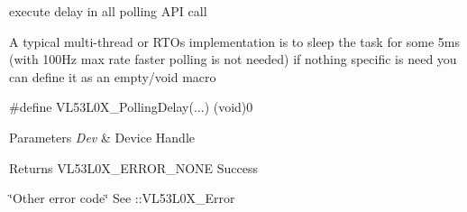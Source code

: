 execute delay in all polling A\+PI call 

A typical multi-\/thread or R\+T\+Os implementation is to sleep the task for some 5ms (with 100\+Hz max rate faster polling is not needed) if nothing specific is need you can define it as an empty/void macro 
\begin{DoxyCode}
\textcolor{preprocessor}{#define VL53L0X\_PollingDelay(...) (void)0}
\end{DoxyCode}
 
\begin{DoxyParams}{Parameters}
{\em Dev} & Device Handle \\
\hline
\end{DoxyParams}
\begin{DoxyReturn}{Returns}
V\+L53\+L0\+X\+\_\+\+E\+R\+R\+O\+R\+\_\+\+N\+O\+NE Success 

\char`\"{}\+Other error code\char`\"{} See \+::\+V\+L53\+L0\+X\+\_\+\+Error 
\end{DoxyReturn}

